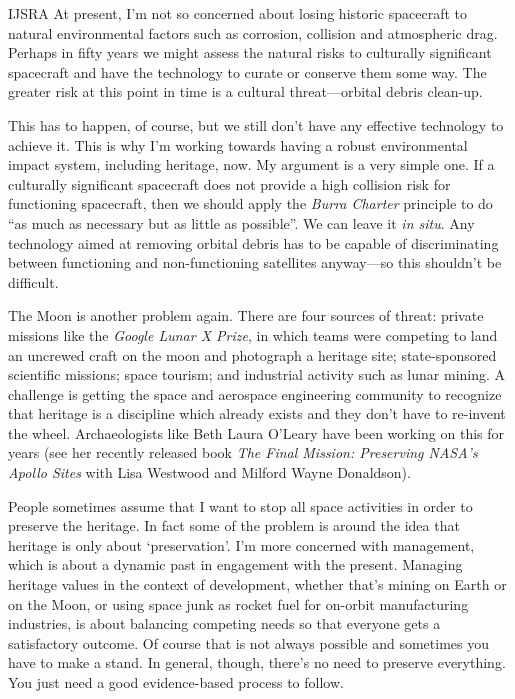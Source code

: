 \begin{labeling}{IJSRA}
	At present, I’m not so concerned about losing historic spacecraft to natural environmental factors such as corrosion, collision and atmospheric drag. Perhaps in fifty years we might assess the natural risks to culturally significant spacecraft and have the technology to curate or conserve them some way. The greater risk at this point in time is a cultural threat—orbital debris clean-up.

	This has to happen, of course, but we still don’t have any effective technology to achieve it. This is why I’m working towards having a robust environmental impact system, including heritage, now. My argument is a very simple one. If a culturally significant spacecraft does not provide a high collision risk for functioning spacecraft, then we should apply the \emph{Burra Charter} principle to do “as much as necessary but as little as possible”. We can leave it \emph{in situ}. Any technology aimed at removing orbital debris has to be capable of discriminating between functioning and non-functioning satellites anyway—so this shouldn’t be difficult.

	The Moon is another problem again. There are four sources of threat: private missions like the \emph{Google Lunar X Prize}, in which teams were competing to land an uncrewed craft on the moon and photograph a heritage site; state-sponsored scientific missions; space tourism; and industrial activity such as lunar mining. A challenge is getting the space and aerospace engineering community to recognize that heritage is a discipline which already exists and they don’t have to re-invent the wheel. Archaeologists like Beth Laura O’Leary have been working on this for years (see her recently released book \emph{The Final Mission: Preserving NASA’s Apollo Sites} with Lisa Westwood and Milford Wayne Donaldson).

	People sometimes assume that I want to stop all space activities in order to preserve the heritage. In fact some of the problem is around the idea that heritage is only about ‘preservation’. I’m more concerned with management, which is about a dynamic past in engagement with the present. Managing heritage values in the context of development, whether that’s mining on Earth or on the Moon, or using space junk as rocket fuel for on-orbit manufacturing industries, is about balancing competing needs so that everyone gets a satisfactory outcome. Of course that is not always possible and sometimes you have to make a stand. In general, though, there’s no need to preserve everything. You just need a good evidence-based process to follow.


\end{labeling}
